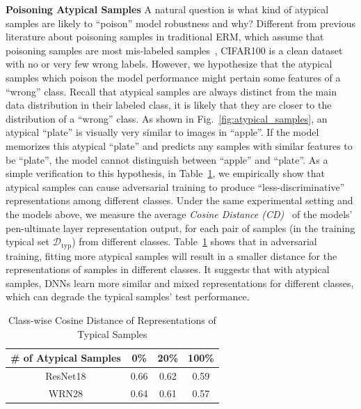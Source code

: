 \noindent\textbf{Poisoning Atypical Samples} A natural question is what kind of atypical samples are likely to ``poison'' model robustness and why? Different from previous literature about poisoning samples in traditional ERM, which assume that poisoning samples are most mis-labeled samples~\cite{li2020gradient}, CIFAR100 is a clean dataset with no or very few wrong labels. However, we hypothesize that the atypical samples which poison the model performance might pertain some features of a ``wrong'' class. Recall that atypical samples are always distinct from the main data distribution in their labeled class, it is likely that they are closer to the distribution of a ``wrong'' class. As shown in  Fig.~\ref{fig:atypical_samples}, an atypical ``plate'' is visually very similar to images in ``apple''. If the model memorizes this atypical ``plate'' and predicts any samples with similar features to be ``plate'', the model cannot distinguish between ``apple'' and ``plate''. As a simple verification to this hypothesis, in Table~\ref{Tab:dist}, we empirically show that atypical samples can cause adversarial training to produce ``less-discriminative'' representations among different classes. Under the same experimental setting and the models above, we measure the average \textit{Cosine Distance (CD)~\footnotemark} of the models' pen-ultimate layer representation output, for each pair of samples (in the training typical set $\mathcal{D}_\text{typ}$) from different classes. Table~\ref{Tab:dist} shows that in adversarial training, fitting more atypical samples will result in a smaller distance for the representations of samples in different classes. It suggests that with atypical samples, DNNs learn more similar and mixed representations for different classes, which can degrade the typical samples' test performance.
\begin{table}[h]
\vspace{-0.5cm}
\small
\centering
\setlength{\tabcolsep}{12pt}
\caption{Class-wise Cosine Distance of Representations of Typical Samples}
\begin{tabular}{c|ccc}
\hline
\# of Atypical Samples & 0\% &20\% &100\%\\
\hline
ResNet18 & 0.66 & 0.62  & 0.59\\
\hline
WRN28 &0.64 & 0.61 & 0.57\\
\hline
\end{tabular}
\vspace{-0.4cm}
\label{Tab:dist}
\end{table}

